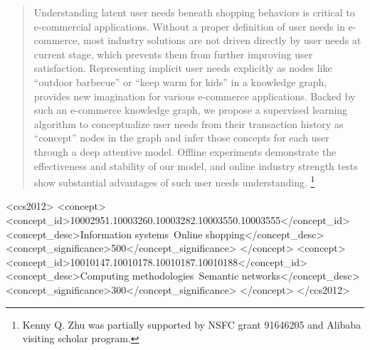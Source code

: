 \documentclass[sigconf]{acmart}
\newcommand{\KZ}[1]{\textcolor{red}{Kenny: #1}}
\begin{document}
\begin{abstract}
Understanding latent user needs beneath shopping behaviors is
critical to e-commercial applications.
Without a proper definition of user needs in e-commerce,
most industry solutions are not driven directly by user needs at current stage, 
which prevents them from further improving user satisfaction.
Representing implicit user needs explicitly as nodes like ``outdoor barbecue'' 
or ``keep warm for kids'' in a knowledge graph, 
provides new imagination for various e-commerce applications.
Backed by such an e-commerce knowledge graph, 
we propose a supervised learning algorithm to conceptualize user needs from 
their transaction history as ``concept'' nodes in the graph 
and infer those concepts for each user
through a deep attentive model.
Offline experiments demonstrate the effectiveness and stability of our model,
and online industry strength tests show substantial advantages of such 
user needs understanding. 
\footnote[2]{Kenny Q. Zhu was partially supported by NSFC grant 91646205 and Alibaba visiting scholar program.}
\end{abstract}


%
%

\begin{CCSXML}
	<ccs2012>
	<concept>
	<concept_id>10002951.10003260.10003282.10003550.10003555</concept_id>
	<concept_desc>Information systems~Online shopping</concept_desc>
	<concept_significance>500</concept_significance>
	</concept>
	<concept>
	<concept_id>10010147.10010178.10010187.10010188</concept_id>
	<concept_desc>Computing methodologies~Semantic networks</concept_desc>
	<concept_significance>300</concept_significance>
	</concept>
	</ccs2012>
\end{CCSXML}
\end{document}
